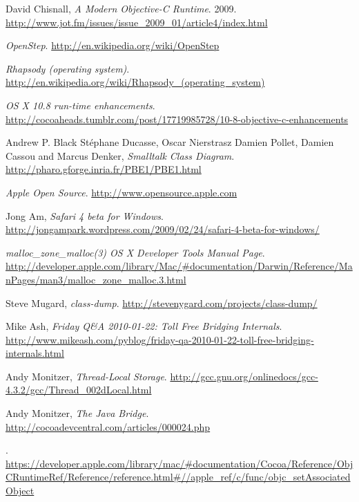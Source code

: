
\def\bibname{Bibliography}
\begin{thebibliography}{99}
\addcontentsline{toc}{chapter}{\bibname}

  David Chisnall,
  \emph{A Modern Objective-C Runtime}.
  2009.
  \url{http://www.jot.fm/issues/issue_2009_01/article4/index.html}
  
  \emph{OpenStep}.
  \url{http://en.wikipedia.org/wiki/OpenStep}
  
  \emph{Rhapsody (operating system)}.
  \url{http://en.wikipedia.org/wiki/Rhapsody_(operating_system)}
  
  \emph{OS X 10.8 run-time enhancements}.
  \url{http://cocoaheads.tumblr.com/post/17719985728/10-8-objective-c-enhancements}
  
  Andrew P. Black St\'{e}phane Ducasse, Oscar Nierstrasz Damien Pollet, Damien Cassou and Marcus Denker,
  \emph{Smalltalk Class Diagram}.
  \url{http://pharo.gforge.inria.fr/PBE1/PBE1.html}
  
  \emph{Apple Open Source}.
  \url{http://www.opensource.apple.com}  

  Jong Am,
  \emph{Safari 4 beta for Windows}.
  \url{http://jongampark.wordpress.com/2009/02/24/safari-4-beta-for-windows/}  
 
  \emph{malloc\_zone\_malloc(3) OS X Developer Tools Manual Page}.
  \url{http://developer.apple.com/library/Mac/\#documentation/Darwin/Reference/ManPages/man3/malloc_zone_malloc.3.html}

  Steve Mugard,
  \emph{class-dump}.
  \url{http://stevenygard.com/projects/class-dump/} 
  
  Mike Ash,
  \emph{Friday Q&A 2010-01-22: Toll Free Bridging Internals}.
  \url{http://www.mikeash.com/pyblog/friday-qa-2010-01-22-toll-free-bridging-internals.html} 

  Andy Monitzer,
  \emph{Thread-Local Storage}.
  \url{http://gcc.gnu.org/onlinedocs/gcc-4.3.2/gcc/Thread_002dLocal.html} 
 
  Andy Monitzer,
  \emph{The Java Bridge}.
  \url{http://cocoadevcentral.com/articles/000024.php} 
  
  \emph{}.
  \url{https://developer.apple.com/library/mac/\#documentation/Cocoa/Reference/ObjCRuntimeRef/Reference/reference.html#//apple_ref/c/func/objc_setAssociatedObject} 

\end{thebibliography}
